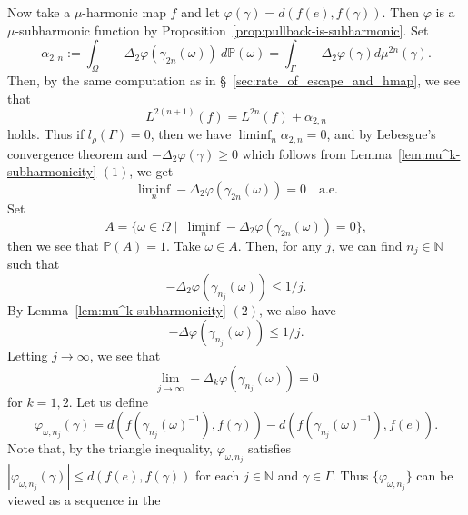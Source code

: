 \documentclass[12pt]{amsart}
\numberwithin{equation}{section}
\theoremstyle{plain}
\theoremstyle{definition}
\theoremstyle{remark}
\newcommand{\N}{{\mathbb N}}
\begin{document}
 Now take a $\mu$-harmonic map $f$ and let
 $\varphi(\gamma) = d(f(e), f(\gamma))$. 
 Then $\varphi$ is a $\mu$-subharmonic function by
 Proposition~\ref{prop:pullback-is-subharmonic}. 
 Set
\begin{equation*}
  \alpha_{2,n}:= \int_{\Omega} -\Delta_2 \varphi(\gamma_{2n}(\omega))
  \ d\mathbb{P}(\omega) 
  = \int_{\Gamma} -\Delta_2 \varphi(\gamma) d\mu^{2n}(\gamma). 
\end{equation*}
 Then, by the same computation as in
 \S~\ref{sec:rate_of_escape_and_hmap},  we see that
\begin{equation*}
  L^{2(n+1)}(f)= L^{2n}(f) + \alpha_{2,n}
\end{equation*}
 holds. 
 Thus if $l_{\rho}(\Gamma)=0$, then we have
 $\liminf_n\alpha_{2,n}=0$, and by Lebesgue's convergence theorem and 
 $-\Delta_2 \varphi(\gamma)\geq 0$ which follows from
 Lemma~\ref{lem:mu^k-subharmonicity} $(1)$, we get 
\begin{equation}
 \label{eq:0_for_each_k}
 \liminf_n -\Delta_2 \varphi(\gamma_{2n}(\omega)) = 0
  \quad \text{a.e.}
\end{equation}
 Set 
\begin{equation*}
   A = 
   \{ \omega \in \Omega \mid \ 
   \liminf_n -\Delta_2 \varphi(\gamma_{2n}(\omega))=0 \},
\end{equation*}
 then we see that $\mathbb{P}(A)=1$. 
 Take $\omega \in A$.  
 Then, for any $j$, we can find $n_j \in \N$ such that
\begin{equation*}
  -\Delta_2 \varphi(\gamma_{n_j}(\omega)) \leq 1/j. 
\end{equation*}
 By Lemma~\ref{lem:mu^k-subharmonicity} $(2)$, we also have
\begin{equation*}
  -\Delta \varphi(\gamma_{n_j}(\omega)) \leq 1/j. 
\end{equation*}
 Letting $j\to \infty$, we see that
\begin{equation}
 \label{eq:converges_to_harmonic}
   \lim_{j\to \infty} -\Delta_k \varphi(\gamma_{n_j}(\omega))=0
\end{equation}
    for $k=1,2$.  Let us define
\begin{equation*}
   \varphi_{\omega,n_j} (\gamma) 
  = d(f(\gamma_{n_j}(\omega)^{-1}), f(\gamma))
    - d(f(\gamma_{n_j}(\omega)^{-1}), f(e)). 
\end{equation*}
Note that, by the triangle inequality, $\varphi_{\omega,n_j}$ satisfies
$|\varphi_{\omega,n_j}(\gamma)|\leq d(f(e),f(\gamma))$ for each 
$j \in \N$ and $\gamma \in \Gamma$. 
Thus $\{\varphi_{\omega,n_j}\}$ can be viewed as a sequence in the
\end{document}
